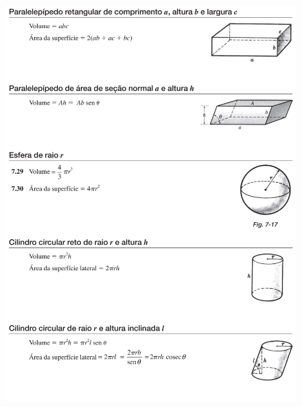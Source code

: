 \begin{figure}[H]
    \centering
    \includegraphics[width=\textwidth]{matematica/geometria/formulas4}
\end{figure}

